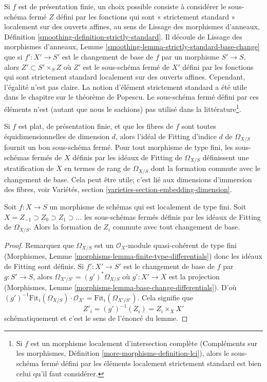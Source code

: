 \medskip\noindent
Si  $f$  est de présentation finie, un choix possible consiste à considérer le
sous-schéma fermé  $Z$  défini par les fonctions qui sont « strictement standard »
localement sur des ouverts affines, au sens de Lissage des morphismes d'anneaux, Définition
 \ref{smoothing-definition-strictly-standard}. Il découle de Lissage des morphismes d'anneaux, Lemme  \ref{smoothing-lemma-strictly-standard-base-change}  que si
 $f' : X' \to S'$  est le changement de base de  $f$  par un morphisme
 $S' \to S$, alors  $Z' \subset S' \times_S Z$  où  $Z'$  est le sous-schéma fermé de
 $X'$  défini par les fonctions qui sont strictement standard localement sur des
ouverts affines. Cependant, l'égalité n'est pas claire. La notion d'élément strictement
standard a été utile dans le chapitre sur le théorème de Popescu. Le sous-schéma
fermé défini par ces éléments n'est (autant que nous le sachions) pas utilisé dans
la littérature\footnote{Si  $f$  est un morphisme
localement d'intersection complète (Compléments sur les morphismes, Définition  \ref{more-morphisms-definition-lci}),
alors le sous-schéma fermé défini par les éléments localement strictement standard
est bien celui qu'il faut considérer.}.

\medskip\noindent
Si  $f$  est plat, de présentation finie, et que les fibres de  $f$ 
sont toutes équidimensionnelles de dimension  $d$, alors l'idéal de
Fitting d'indice  $d$ de  $\Omega_{X/S}$  fournit un bon sous-schéma
fermé. Pour tout morphisme de type fini, les sous-schémas fermés de  $X$ 
définis par les idéaux de Fitting de  $\Omega_{X/S}$  définissent une stratification
de  $X$  en termes de rang de  $\Omega_{X/S}$  dont la formation commute avec
le changement de base. Cela peut être utile; c'est lié aux dimensions d'immersion
des fibres, voir Variétés, section  \ref{varieties-section-embedding-dimension}.

\begin{lemma}
\label{lemma-base-change-and-fitting-ideal-omega}
Soit  $f : X \to S$  un morphisme de schémas qui est localement de type fini. Soit
 $X = Z_{-1} \supset Z_0 \supset Z_1 \supset \ldots$  les sous-schémas fermés définis par les idéaux de Fitting de
 $\Omega_{X/S}$. Alors la formation de  $Z_i$  commute avec tout changement de
base.
\end{lemma}

\begin{proof}
Remarquez que  $\Omega_{X/S}$  est un  $\mathcal{O}_X$-module quasi-cohérent de type fini
(Morphismes, Lemme  \ref{morphisms-lemma-finite-type-differentials}) donc les idéaux de Fitting sont définis. Si
 $f' : X' \to S'$  est le changement de base de  $f$  par  $g : S' \to S$, alors
 $\Omega_{X'/S'} = (g')^*\Omega_{X/S}$  où  $g' : X' \to X$  est la projection (Morphismes, Lemme  \ref{morphisms-lemma-base-change-differentials}).
D'où  $(g')^{-1}\text{Fit}_i(\Omega_{X/S}) \cdot \mathcal{O}_{X'} =
\text{Fit}_i(\Omega_{X'/S'})$. Cela signifie que
$$
Z'_i = (g')^{-1}(Z_i) = Z_i \times_X X'
$$
schématiquement et c'est le sens de l'énoncé du lemme.
\end{proof}

